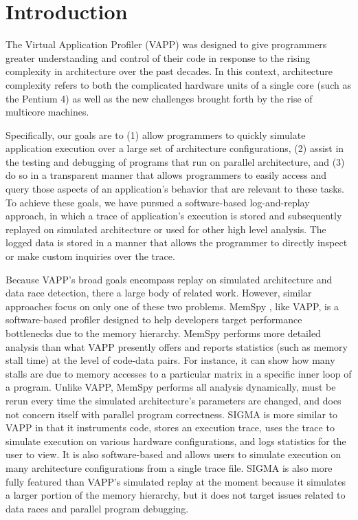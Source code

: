 \section{Introduction}
\label{sec:intro}
The Virtual Application Profiler (VAPP) was designed to give programmers
greater understanding and control of their code in response to
the rising complexity in architecture over the past decades.
In this context, architecture complexity refers to both the
complicated hardware units of a single core (such as the Pentium 4)
as well as the new challenges brought forth by the rise of
multicore machines.

Specifically, our goals are to (1) allow programmers to quickly
simulate application execution over a large set of architecture
configurations, (2) assist in the testing and debugging of
programs that run on parallel architecture, and (3) do so in a
transparent manner that allows programmers to easily access and
query those aspects of an application's behavior that are relevant to
these tasks.  To achieve these goals, we have pursued a software-based
log-and-replay approach, in which a trace of application's execution
is stored and subsequently replayed on simulated architecture or
used for other high level analysis.  The logged data is stored
in a manner that allows the programmer to directly inspect or
make custom inquiries over the trace.

Because VAPP's broad goals encompass replay on simulated architecture
and data race detection, there a large body of related work.
However, similar approaches focus on only one of these two problems.
MemSpy \cite{martonosi1992memspy}, like VAPP, is a software-based
profiler designed to help developers target performance bottlenecks 
due to the memory hierarchy.  MemSpy performs more detailed analysis
than what VAPP presently offers and reports statistics (such as
memory stall time) at the level of code-data pairs.  For instance,
it can show how many stalls are due to memory accesses to a particular
matrix in a specific inner loop of a program.  Unlike VAPP, MemSpy
performs all analysis dynamically, must be rerun every time
the simulated architecture's parameters are changed, and does not
concern itself with parallel program correctness.
SIGMA \cite{derose2002sigma} is more similar to VAPP in that it
instruments code, stores an execution trace, uses the trace
to simulate execution on various hardware configurations, and
logs statistics for the user to view.  It is also software-based
and allows users to simulate execution on many architecture
configurations from a single trace file.  SIGMA is also more
fully featured than VAPP's simulated replay at the moment because it simulates
a larger portion of the memory hierarchy, but it does not target
issues related to data races and parallel program debugging.

